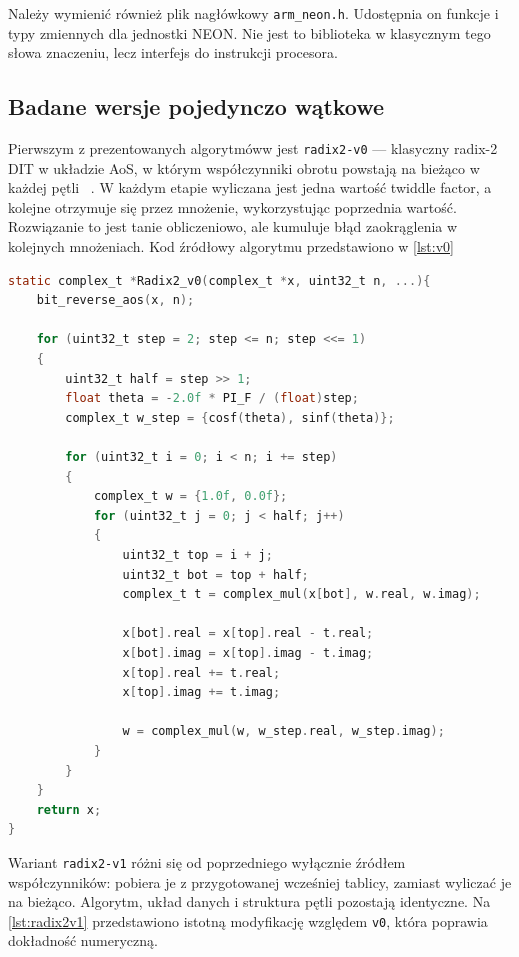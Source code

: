 Należy wymienić również plik nagłówkowy \texttt{arm\_neon.h}. Udostępnia on funkcje
i typy zmiennych dla jednostki NEON. Nie jest to
biblioteka w klasycznym tego słowa znaczeniu, lecz interfejs do instrukcji
procesora.

\subsection{Badane wersje pojedynczo wątkowe}\label{subsection:WersjeJednowatkowe}

Pierwszym z prezentowanych algorytmóww jest \texttt{radix2-v0} — klasyczny radix-2 DIT w układzie AoS,
w którym współczynniki obrotu powstają na bieżąco w każdej pętli ~\cite{NumericalRecipesC}. W każdym etapie wyliczana
jest jedna wartość twiddle factor, a kolejne otrzymuje się przez mnożenie, wykorzystując poprzednia wartość. Rozwiązanie to jest tanie obliczeniowo, ale
kumuluje błąd zaokrąglenia w kolejnych mnożeniach. Kod źródłowy algorytmu przedstawiono w \cref{lst:v0}

\begin{lstlisting}[language=C,caption={Kompletna implentacja \texttt{radix2-v0}},label=lst:v0]
static complex_t *Radix2_v0(complex_t *x, uint32_t n, ...){
    bit_reverse_aos(x, n);

    for (uint32_t step = 2; step <= n; step <<= 1)
    {
        uint32_t half = step >> 1;
        float theta = -2.0f * PI_F / (float)step;
        complex_t w_step = {cosf(theta), sinf(theta)};

        for (uint32_t i = 0; i < n; i += step)
        {
            complex_t w = {1.0f, 0.0f};
            for (uint32_t j = 0; j < half; j++)
            {
                uint32_t top = i + j;
                uint32_t bot = top + half;
                complex_t t = complex_mul(x[bot], w.real, w.imag);

                x[bot].real = x[top].real - t.real;
                x[bot].imag = x[top].imag - t.imag;
                x[top].real += t.real;
                x[top].imag += t.imag;

                w = complex_mul(w, w_step.real, w_step.imag);
            }
        }
    }
    return x;
}
\end{lstlisting}

Wariant \texttt{radix2-v1} różni się od poprzedniego wyłącznie źródłem
współczynników: pobiera je z przygotowanej wcześniej tablicy, zamiast wyliczać
je na bieżąco. Algorytm, układ danych i struktura pętli pozostają
identyczne. Na \cref{lst:radix2v1} przedstawiono istotną modyfikację względem
\texttt{v0}, która poprawia dokładność numeryczną.

